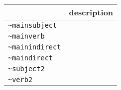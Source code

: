 \documentclass[]{article}
\begin{document}
\begin{longtable}[]{@{}ll@{}}
\toprule
\begin{minipage}[b]{0.30\columnwidth}\raggedright\strut
\strut
\end{minipage} & \begin{minipage}[b]{0.20\columnwidth}\raggedright\strut
description\strut
\end{minipage}\tabularnewline
\midrule
\endhead
\begin{minipage}[t]{0.30\columnwidth}\raggedright\strut
\texttt{\textasciitilde{}mainsubject}\strut
\end{minipage} & \begin{minipage}[t]{0.20\columnwidth}\raggedright\strut
\strut
\end{minipage}\tabularnewline
\begin{minipage}[t]{0.30\columnwidth}\raggedright\strut
\texttt{\textasciitilde{}mainverb}\strut
\end{minipage} & \begin{minipage}[t]{0.20\columnwidth}\raggedright\strut
\strut
\end{minipage}\tabularnewline
\begin{minipage}[t]{0.30\columnwidth}\raggedright\strut
\texttt{\textasciitilde{}mainindirect}\strut
\end{minipage} & \begin{minipage}[t]{0.20\columnwidth}\raggedright\strut
\strut
\end{minipage}\tabularnewline
\begin{minipage}[t]{0.30\columnwidth}\raggedright\strut
\texttt{\textasciitilde{}maindirect}\strut
\end{minipage} & \begin{minipage}[t]{0.20\columnwidth}\raggedright\strut
\strut
\end{minipage}\tabularnewline
\begin{minipage}[t]{0.30\columnwidth}\raggedright\strut
\texttt{\textasciitilde{}subject2}\strut
\end{minipage} & \begin{minipage}[t]{0.20\columnwidth}\raggedright\strut
\strut
\end{minipage}\tabularnewline
\begin{minipage}[t]{0.30\columnwidth}\raggedright\strut
\texttt{\textasciitilde{}verb2}\strut
\end{minipage} & \begin{minipage}[t]{0.20\columnwidth}\raggedright\strut
\strut
\end{minipage}\tabularnewline

\end{longtable}
\end{document}
